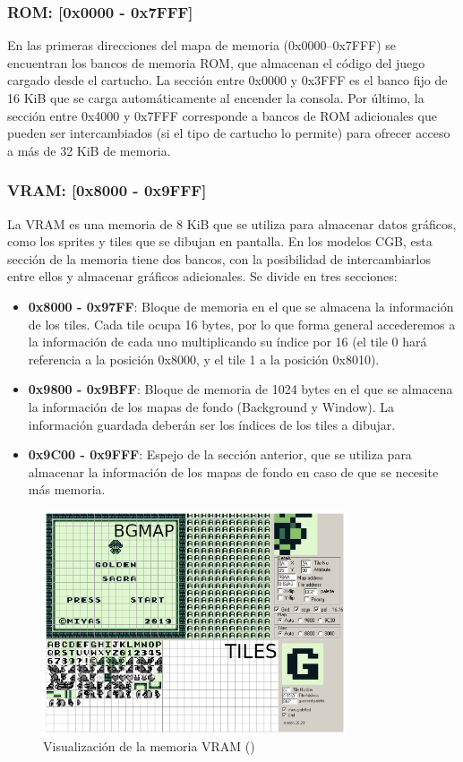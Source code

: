 \subsubsection{ROM: [0x0000 - 0x7FFF]}
En las primeras direcciones del mapa de memoria (0x0000–0x7FFF) se encuentran los bancos de memoria ROM, que almacenan el código del juego cargado desde el cartucho. La sección entre 0x0000 y 0x3FFF es el banco fijo de 16 KiB que se carga automáticamente al encender la consola. Por último, la sección entre 0x4000 y 0x7FFF corresponde a bancos de ROM adicionales que pueden ser intercambiados (si el tipo de cartucho lo permite) para ofrecer acceso a más de 32 KiB de memoria.

\subsubsection{VRAM: [0x8000 - 0x9FFF]}\label{mem:vram}
La VRAM es una memoria de 8 KiB que se utiliza para almacenar datos gráficos, como los sprites y tiles que se dibujan en pantalla. En los modelos CGB, esta sección de la memoria tiene dos bancos, con la posibilidad de intercambiarlos entre ellos y almacenar gráficos adicionales.
\clearpage
Se divide en tres secciones:
\begin{itemize}
    \item \label{mem:vram_1} \textbf{0x8000 - 0x97FF}: Bloque de memoria en el que se almacena la información de los tiles. Cada tile ocupa 16 bytes, por lo que forma general accederemos a la información de cada uno multiplicando su índice por 16 (el tile 0 hará referencia a la posición 0x8000, y el tile 1 a la posición 0x8010).
    \item \textbf{0x9800 - 0x9BFF}: Bloque de memoria de 1024 bytes en el que se almacena la información de los mapas de fondo (Background y Window). La información guardada deberán ser los índices de los tiles a dibujar.
    \item \textbf{0x9C00 - 0x9FFF}: Espejo de la sección anterior, que se utiliza para almacenar la información de los mapas de fondo en caso de que se necesite más memoria.
\end{itemize}

\begin{figure}[H]
    \centering
    \includegraphics[width=0.8\textwidth]{include/images/mem_vram.png}
    \caption{Visualización de la memoria VRAM (\cite{goldensacra})}
    \label{figure:mem_vram}
\end{figure}

